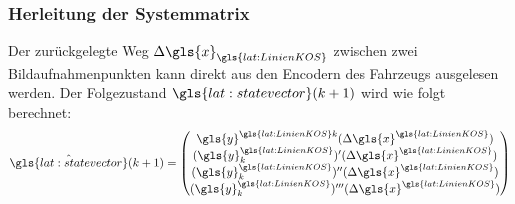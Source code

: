 \subsubsection{Herleitung der Systemmatrix}
Der zurückgelegte Weg \begin{math} \scl{\Delta\gls{x}}_{\gls{lat:LinienKOS}} \end{math} zwischen zwei Bildaufnahmenpunkten kann direkt aus den Encodern des Fahrzeugs ausgelesen werden. Der Folgezustand  \(\gls{lat:statevector}(\scl{k}+1)\) wird wie folgt berechnet:
\begin{equation}
\label{eq:nextstatemapping}
\hat{\gls{lat:statevector}}(\scl{k}+1) =
\begin{pmatrix}
\gls{y}^{\gls{lat:LinienKOS}\scl{k}}(\scl{\Delta\gls{x}}^{\gls{lat:LinienKOS}}) \\
\der{(\gls{y}^{\gls{lat:LinienKOS}}_{\scl{k}})}(\scl{\Delta\gls{x}}^{\gls{lat:LinienKOS}}) \\
\derII{(\gls{y}^{\gls{lat:LinienKOS}}_{\scl{k}})}(\scl{\Delta\gls{x}}^{\gls{lat:LinienKOS}}) \\
\derIII{(\gls{y}^{\gls{lat:LinienKOS}}_{\scl{k}})}(\scl{\Delta\gls{x}}^{\gls{lat:LinienKOS}}) \\
\end{pmatrix}
\end{equation}

